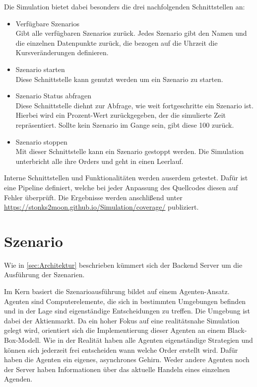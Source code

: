 Die Simulation bietet dabei besonders die drei nachfolgenden Schnittstellen an:
\begin{itemize}
    \item Verfügbare Szenarios\\
        Gibt alle verfügbaren Szenarios zurück. Jedes Szenario gibt den Namen und die einzelnen Datenpunkte zurück, die bezogen auf die Uhrzeit die Kursveränderungen definieren.
    \item Szenario starten\\
        Diese Schnittstelle kann genutzt werden um ein Szenario zu starten.
    \item Szenario Status abfragen\\
        Diese Schnittstelle diehnt zur Abfrage, wie weit fortgeschritte ein Szenario ist. Hierbei wird ein Prozent-Wert zurückgegeben, der die simulierte Zeit repräsentiert. Sollte kein Szenario im Gange sein, gibt diese 100 zurück.
    \item Szenario stoppen\\
        Mit dieser Schnittstelle kann ein Szenario gestoppt werden. Die Simulation unterbricht alle ihre Orders und geht in einen Leerlauf.
\end{itemize}

Interne Schnittstellen und Funktionalitäten werden auserdem getestet.
Dafür ist eine Pipeline definiert, welche bei jeder Anpassung des Quellcodes diesen auf Fehler überprüft.
Die Ergebnisse werden anschlißend unter \href{https://stonks2moon.github.io/Simulation/coverage/}{https://stonks2moon.github.io/Simulation/coverage/} publiziert.
















\section{Szenario}
Wie in \autoref{sec:Architektur} beschrieben kümmert sich der Backend Server um die Ausführung der Szenarien.

Im Kern basiert die Szenarioausführung bildet auf einem Agenten-Ansatz. Agenten sind Computerelemente, die sich in bestimmten Umgebungen befinden und in der Lage sind eigenständige Entscheidungen zu treffen. Die Umgebung ist dabei der Aktienmarkt.
Da ein hoher Fokus auf eine realitätsnahe Simulation gelegt wird, orientiert sich die Implementierung dieser Agenten an einem Black-Box-Modell.
Wie in der Realität haben alle Agenten eigenständige Strategien und können sich jederzeit frei entscheiden wann welche Order erstellt wird. Dafür haben die Agenten ein eigenes, asynchrones Gehirn.
Weder andere Agenten noch der Server haben Informationen über das aktuelle Handeln eines einzelnen Agenden.


